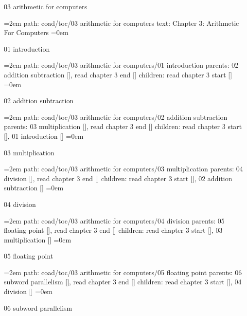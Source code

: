 \par\endgroup
\bigskip
{}
03 arithmetic for computers
\smallskip
\par\begingroup
\leftskip=2em
path: coad/toc/03 arithmetic for computers
\smallskip
text:  Chapter 3: Arithmetic For Computers
\smallskip
\leftskip=0em
\par\endgroup
\bigskip
{}
01 introduction
\smallskip
\par\begingroup
\leftskip=2em
path: coad/toc/03 arithmetic for computers/01 introduction
\smallskip
parents:  02 addition subtraction [], read chapter 3 end []
\smallskip
children: read chapter 3 start []
\smallskip
\leftskip=0em
\par\endgroup
\bigskip
{}
02 addition subtraction
\smallskip
\par\begingroup
\leftskip=2em
path: coad/toc/03 arithmetic for computers/02 addition subtraction
\smallskip
parents:  03 multiplication [], read chapter 3 end []
\smallskip
children: read chapter 3 start [], 01 introduction []
\smallskip
\leftskip=0em
\par\endgroup
\bigskip
{}
03 multiplication
\smallskip
\par\begingroup
\leftskip=2em
path: coad/toc/03 arithmetic for computers/03 multiplication
\smallskip
parents:  04 division [], read chapter 3 end []
\smallskip
children: read chapter 3 start [], 02 addition subtraction []
\smallskip
\leftskip=0em
\par\endgroup
\bigskip
{}
04 division
\smallskip
\par\begingroup
\leftskip=2em
path: coad/toc/03 arithmetic for computers/04 division
\smallskip
parents:  05 floating point [], read chapter 3 end []
\smallskip
children: read chapter 3 start [], 03 multiplication []
\smallskip
\leftskip=0em
\par\endgroup
\bigskip
{}
05 floating point
\smallskip
\par\begingroup
\leftskip=2em
path: coad/toc/03 arithmetic for computers/05 floating point
\smallskip
parents:  06 subword parallelism [], read chapter 3 end []
\smallskip
children: read chapter 3 start [], 04 division []
\smallskip
\leftskip=0em
\par\endgroup
\bigskip
{}
06 subword parallelism
\smallskip
\par\begingroup
